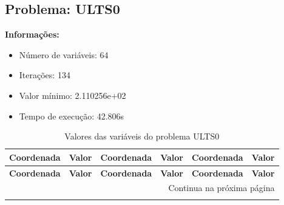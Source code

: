 \documentclass[12pt]{article}
\begin{document}
\newpage            
\subsection{Problema: ULTS0}

\textbf{Informações:}
\begin{itemize}
\item Número de variáveis: 64
\item Iterações: 134
\item Valor mínimo: 2.110256e+02
\item Tempo de execução: 42.806s
\end{itemize}

\small
\begin{longtable}{@{}cc|cc|cc@{}}
\caption{Valores das variáveis do problema ULTS0} \\
\toprule
\textbf{Coordenada} & \textbf{Valor} & \textbf{Coordenada} & \textbf{Valor} & \textbf{Coordenada} & \textbf{Valor} \\
\midrule
\endfirsthead

\toprule
\textbf{Coordenada} & \textbf{Valor} & \textbf{Coordenada} & \textbf{Valor} & \textbf{Coordenada} & \textbf{Valor} \\
\midrule
\endhead

\midrule \multicolumn{6}{r}{{Continua na próxima página}} \\ \midrule
\endfoot


\end{longtable}
\end{document}
